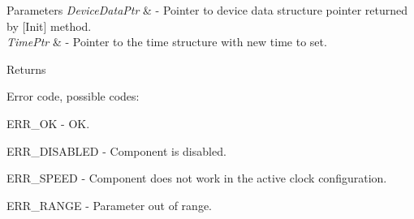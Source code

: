 \begin{DoxyParams}{Parameters}
{\em Device\+Data\+Ptr} & -\/ Pointer to device data structure pointer returned by \mbox{[}Init\mbox{]} method. \\
\hline
{\em Time\+Ptr} & -\/ Pointer to the time structure with new time to set. \\
\hline
\end{DoxyParams}
\begin{DoxyReturn}{Returns}

\begin{DoxyItemize}
\item Error code, possible codes\+:
\begin{DoxyItemize}
\item E\+R\+R\+\_\+\+OK -\/ OK.
\item E\+R\+R\+\_\+\+D\+I\+S\+A\+B\+L\+ED -\/ Component is disabled.
\item E\+R\+R\+\_\+\+S\+P\+E\+ED -\/ Component does not work in the active clock configuration.
\item E\+R\+R\+\_\+\+R\+A\+N\+GE -\/ Parameter out of range. 
\end{DoxyItemize}
\end{DoxyItemize}
\end{DoxyReturn}

